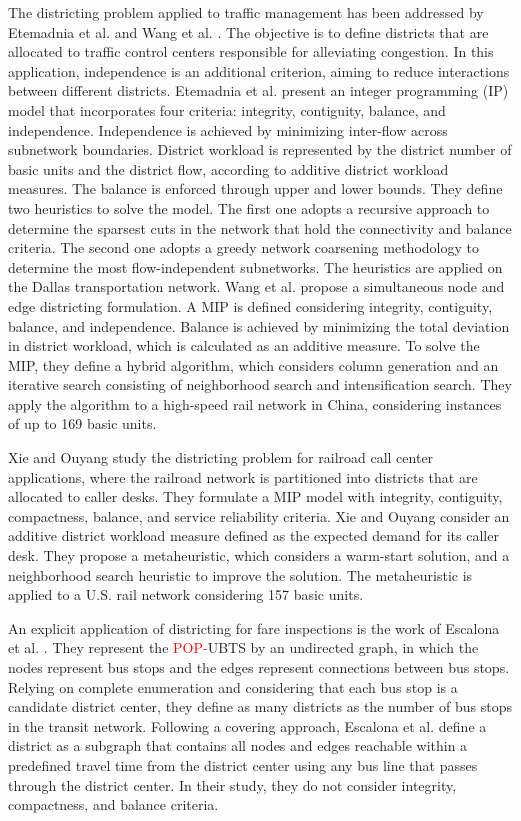 \documentclass[preprint,11pt]{elsarticle}
\begin{document}
The districting problem applied to traffic management has been addressed by Etemadnia et al. \citep{Etemadnia2014} and Wang et al. \citep{Wang2021}. The objective is to define districts that are allocated to traffic control centers responsible for alleviating congestion. 
In this application, independence is an additional criterion, aiming to reduce interactions between different districts.
Etemadnia et al. \citep{Etemadnia2014} present an integer programming (IP) model that incorporates four criteria: integrity, contiguity, balance, and independence. 
Independence is achieved by minimizing inter-flow across subnetwork boundaries. 
District workload is represented by the district number of basic units and the district flow, according to additive district workload measures.
The balance is enforced through upper and lower bounds.
They define two heuristics to solve the model. 
The first one adopts a recursive approach to determine the sparsest cuts in the network that hold the connectivity and balance  criteria. 
The second one adopts a greedy network coarsening methodology to determine the most flow-independent subnetworks.
The heuristics are applied on the Dallas transportation network. 
Wang et al. \citep{Wang2021} propose a simultaneous node and edge districting formulation. 
A MIP is defined considering integrity, contiguity, balance, and independence.
Balance is achieved by minimizing the total deviation in district workload, which is calculated as an additive measure. 
To solve the MIP, they define a hybrid algorithm, which considers column generation and an iterative search consisting of neighborhood search and intensification search.
They apply the algorithm to a high-speed rail network in China, considering instances of up to 169 basic units.

Xie and Ouyang \citep{Xie2016} study the districting problem for railroad call center applications, where the railroad network is partitioned into districts that are allocated to caller desks. 
They formulate a MIP model with integrity, contiguity, compactness, balance, and service reliability criteria.
Xie and Ouyang \citep{Xie2016} consider an additive district workload measure defined as the expected demand for its caller desk.
They propose a metaheuristic, which considers a warm-start solution, and a neighborhood search heuristic to improve the solution.
The metaheuristic is applied to a U.S. rail network considering 157 basic units.

An explicit application of districting for fare inspections is the work of Escalona et al. \citep{Escalona2025}.
They represent the \textcolor{red}{POP-}UBTS by an undirected graph, in which the nodes represent bus stops and the edges represent connections between bus stops.
Relying on complete enumeration and considering that each bus stop is a candidate district center, they define as many districts as the number of bus stops in the transit network.
Following a covering approach, Escalona et al. \citep{Escalona2025} define a district as a subgraph that contains all nodes and edges reachable within a predefined travel time from the district center using any bus line that passes through the district center. 
In their study, they do not consider integrity, compactness, and balance criteria.
\end{document}
